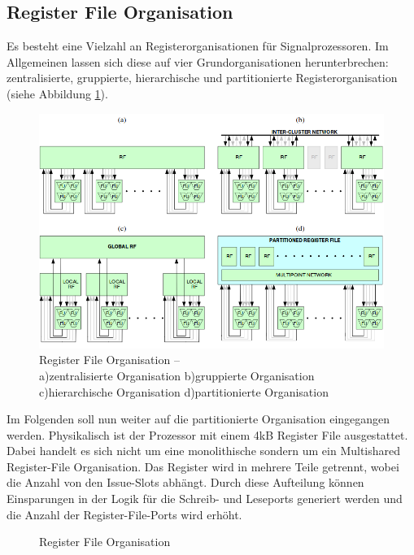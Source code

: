 \subsection{Register File Organisation}
Es besteht eine Vielzahl an Registerorganisationen für Signalprozessoren. Im Allgemeinen lassen sich diese auf vier Grundorganisationen herunterbrechen: zentralisierte, gruppierte, hierarchische und partitionierte Registerorganisation (siehe Abbildung \ref{fig:RegisterOrga}).\newline
\begin{figure}[htbp] 
	\centering
	\includegraphics[width=\textwidth]{fig/Register_orga.png}
	\caption[Register File Organisation]{Register File Organisation –\\ a)zentralisierte Organisation b)gruppierte Organisation c)hierarchische Organisation d)partitionierte Organisation  \cite{paya2010multi}}
	\label{fig:RegisterOrga}
\end{figure}
\newline
Im Folgenden soll nun weiter auf die partitionierte Organisation eingegangen werden. Physikalisch ist der Prozessor mit einem 4kB Register File ausgestattet. Dabei handelt es sich nicht um eine monolithische sondern um ein Multishared Register-File Organisation. Das Register wird in mehrere Teile getrennt, wobei die Anzahl von den Issue-Slots abhängt. Durch diese Aufteilung können Einsparungen in der Logik für die Schreib- und Leseports generiert werden und die Anzahl der Register-File-Ports wird erhöht.
\begin{scriptsize}
	\begin{figure}[htbp] 
		\centering
		
		\caption{Register File Organisation}
		\label{fig:reg_orga}
	\end{figure}
\end{scriptsize}

